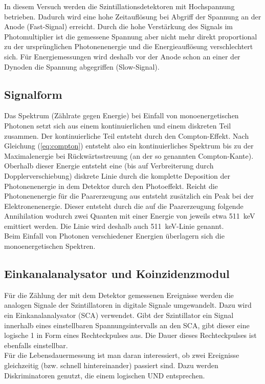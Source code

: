 In diesem Versuch werden die Szintillationsdetektoren mit Hochspannung betrieben. Dadurch wird eine hohe Zeitauflösung bei Abgriff der Spannung an der Anode (Fast-Signal) erreicht. Durch die hohe Verstärkung des Signals im Photomultiplier ist die gemessene Spannung aber nicht mehr direkt proportional zu der ursprünglichen Photonenenergie und die Energieauflösung verschlechtert sich. Für Energiemessungen wird deshalb vor der Anode schon an einer der Dynoden die Spannung abgegriffen (Slow-Signal).

\subsection{Signalform}
Das Spektrum (Zählrate gegen Energie) bei Einfall von monoenergetischen Photonen setzt sich aus einem kontinuierlichen und einem diskreten Teil zusammen. Der kontinuierliche Teil entsteht durch den Compton-Effekt. Nach Gleichung (\ref{eq:compton}) entsteht also ein kontinuierliches Spektrum bis zu der Maximalenergie bei Rückwärtsstreuung (an der so genannten Compton-Kante). Oberhalb dieser Energie entsteht eine (bis auf Verbreiterung durch Dopplerverschiebung) diskrete Linie durch die komplette Deposition der Photonenenergie in dem Detektor durch den Photoeffekt. Reicht die Photonenenergie für die Paarerzeugung aus entsteht zusätzlich ein Peak bei der Elektronenenergie. Dieser entsteht durch die auf die Paarerzeugung folgende Annihilation wodurch zwei Quanten mit einer Energie von jeweils etwa \SI{511}{\kilo\electronvolt} emittiert werden. Die Linie wird deshalb auch \SI{511}{\kilo\electronvolt}-Linie genannt. \\

Beim Einfall von Photonen verschiedener Energien überlagern sich die monoenergetischen Spektren.

\subsection{Einkanalanalysator und Koinzidenzmodul}
Für die Zählung der mit dem Detektor gemessenen Ereignisse werden die analogen Signale der Szintillatoren in digitale Signale umgewandelt. Dazu wird ein Einkanalanalysator (SCA) verwendet. Gibt der Szintillator ein Signal innerhalb eines einstellbaren Spannungsintervalls an den SCA, gibt dieser eine logische 1 in Form eines Rechteckpulses aus. Die Dauer dieses Rechteckpulses ist ebenfalls einstellbar.\\

Für die Lebensdauermessung ist man daran interessiert, ob zwei Ereignisse gleichzeitig (bzw. schnell hintereinander) passiert sind. Dazu werden Diskriminatoren genutzt, die einem logischen UND entsprechen.

